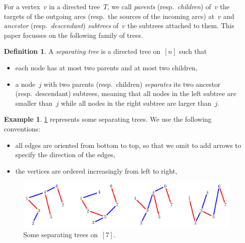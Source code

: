 \documentclass{amsart}
\theoremstyle{definition}
\newtheorem{definition}[theorem]{Definition}
\newtheorem{example}[theorem]{Example}
\newcommand{\darkblue}{\color{darkblue}} %
\newcommand{\defn}[1]{\textsl{\darkblue #1}} %
\begin{document}
For a vertex~$v$ in a directed tree~$T$, we call \defn{parents} (resp.~\defn{children}) of~$v$ the targets of the outgoing arcs (resp.~the  sources of the incoming arcs) at~$v$ and \defn{ancestor} (resp.~\defn{descendant}) \defn{subtrees} of~$v$ the subtrees attached to them.
This paper focusses on the following family of trees.

\begin{definition}
\label{def:separatingTree}
A \defn{separating tree} is a directed tree on~$[n]$ such that
\begin{itemize}
\item each node has at most two parents and at most two children,
\item a node~$j$ with two parents (resp.~children) \defn{separates} its two ancestor (resp.~descendant) subtrees, meaning that all nodes in the left subtree are smaller than~$j$ while all nodes in the right subtree are larger than~$j$.
\end{itemize}
\end{definition}

\begin{example}
\label{exm:separatingTrees}
\cref{fig:separatingTrees} represents some separating trees. We use the following conventions:
\begin{itemize}
\item all edges are oriented from bottom to top, so that we omit to add arrows to specify the direction of the edges,
\item the vertices are ordered increasingly from left to right,
\end{itemize}
%
\begin{figure}[h]
	\capstart
	\centerline{\includegraphics[scale=.85]{figures/separatingTrees}}
	\caption{Some separating trees on~$[7]$.}
	\label{fig:separatingTrees}
\end{figure}
%
\end{example}
\end{document}

